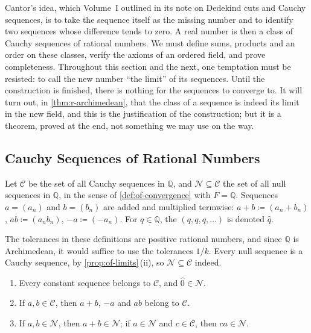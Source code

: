 Cantor's idea, which Volume~I outlined in its note on Dedekind cuts and Cauchy sequences, is to take the sequence itself as the missing number and to identify two sequences whose difference tends to zero. A real number is then a class of Cauchy sequences of rational numbers. We must define sums, products and an order on these classes, verify the axioms of an ordered field, and prove completeness. Throughout this section and the next, one temptation must be resisted: to call the new number ``the limit'' of its sequences. Until the construction is finished, there is nothing for the sequences to converge to. It will turn out, in \cref{thm:r-archimedean}, that the class of a sequence is indeed its limit in the new field, and this is the justification of the construction; but it is a theorem, proved at the end, not something we may use on the way.

\subsection{Cauchy Sequences of Rational Numbers}

\begin{definition}
\label{def:cauchy-rationals}
Let $\mathcal C$ be the set of all Cauchy sequences in $\mathbb Q$, and $\mathcal N\subseteq\mathcal C$ the set of all null sequences in $\mathbb Q$, in the sense of \cref{def:of-convergence} with $F=\mathbb Q$. Sequences $a=(a_n)$ and $b=(b_n)$ are added and multiplied termwise: $a+b\coloneqq(a_n+b_n)$, $ab\coloneqq(a_nb_n)$, $-a\coloneqq(-a_n)$. For $q\in\mathbb Q$, the  $(q,q,q,\ldots)$ is denoted $\hat q$.
\end{definition}

The tolerances in these definitions are positive rational numbers, and since $\mathbb Q$ is Archimedean, it would suffice to use the tolerances $1/k$. Every null sequence is a Cauchy sequence, by \cref{prop:of-limits}\,(ii), so $\mathcal N\subseteq\mathcal C$ indeed.

\begin{lemma}
\label{lem:cauchy-ring}
\leavevmode
\begin{enumerate}
\item Every constant sequence belongs to $\mathcal C$, and $\hat0\in\mathcal N$.
\item If $a,b\in\mathcal C$, then $a+b$, $-a$ and $ab$ belong to $\mathcal C$.
\item If $a,b\in\mathcal N$, then $a+b\in\mathcal N$; if $a\in\mathcal N$ and $c\in\mathcal C$, then $ca\in\mathcal N$.
\end{enumerate}
\end{lemma}

